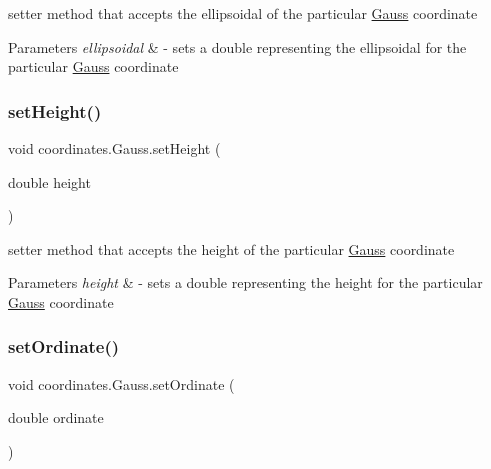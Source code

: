 setter method that accepts the ellipsoidal of the particular \hyperlink{classcoordinates_1_1_gauss}{Gauss} coordinate 


\begin{DoxyParams}{Parameters}
{\em ellipsoidal} & -\/ sets a double representing the ellipsoidal for the particular \hyperlink{classcoordinates_1_1_gauss}{Gauss} coordinate \\
\hline
\end{DoxyParams}
\mbox{\label{classcoordinates_1_1_gauss_a3af44a951b3cb9ea5f5cf143b1cb2253}} 
\subsubsection{\texorpdfstring{set\+Height()}{setHeight()}}
{\footnotesize\ttfamily void coordinates.\+Gauss.\+set\+Height (\begin{DoxyParamCaption}\item[{double}]{height }\end{DoxyParamCaption})}



setter method that accepts the height of the particular \hyperlink{classcoordinates_1_1_gauss}{Gauss} coordinate 


\begin{DoxyParams}{Parameters}
{\em height} & -\/ sets a double representing the height for the particular \hyperlink{classcoordinates_1_1_gauss}{Gauss} coordinate \\
\hline
\end{DoxyParams}
\mbox{\label{classcoordinates_1_1_gauss_a3afbbdd05c3a68dd778760cb824b0b03}} 
\subsubsection{\texorpdfstring{set\+Ordinate()}{setOrdinate()}}
{\footnotesize\ttfamily void coordinates.\+Gauss.\+set\+Ordinate (\begin{DoxyParamCaption}\item[{double}]{ordinate }\end{DoxyParamCaption})}



